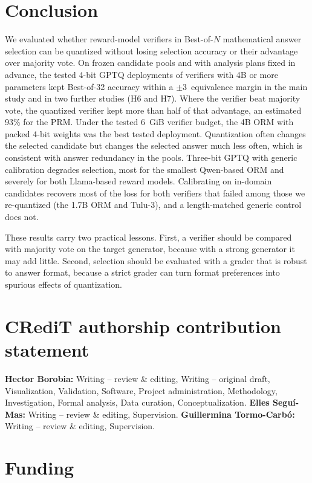 \section{Conclusion}\label{sec:conclusion}

We evaluated whether reward-model verifiers in Best-of-$N$ mathematical answer selection
can be quantized without losing selection accuracy or their advantage over majority
vote. On frozen candidate pools and with analysis plans fixed in advance, the tested
4-bit GPTQ deployments of verifiers with 4B or more parameters kept Best-of-32 accuracy
within a $\pm3$\pp\ equivalence margin in the main study and in two further studies (H6 and H7).
Where the verifier beat majority vote, the quantized verifier kept more than half of
that advantage, an estimated 93\% for the PRM. Under the tested 6~GiB verifier budget,
the 4B ORM with packed 4-bit weights was the best tested deployment. Quantization often
changes the selected candidate but changes the selected answer much less often, which is
consistent with answer redundancy in the pools. Three-bit GPTQ with generic calibration
degrades selection, most for the smallest Qwen-based ORM and severely for both
Llama-based reward models. Calibrating on in-domain candidates recovers most of the
loss for both verifiers that failed among those we re-quantized (the 1.7B ORM and
Tulu-3), and a length-matched generic control does not.

These results carry two practical lessons. First, a verifier should be compared with
majority vote on the target generator, because with a strong generator it may add
little. Second, selection should be evaluated with a grader that is robust to answer
format, because a strict grader can turn format preferences into spurious effects of
quantization.

\section*{CRediT authorship contribution statement}

\textbf{Hector Borobia:} Writing -- review \& editing, Writing -- original draft,
Visualization, Validation, Software, Project administration, Methodology,
Investigation, Formal analysis, Data curation, Conceptualization. \textbf{Elies
Segu\'{i}-Mas:} Writing -- review \& editing, Supervision. \textbf{Guillermina
Tormo-Carb\'{o}:} Writing -- review \& editing, Supervision.

\section*{Funding}

